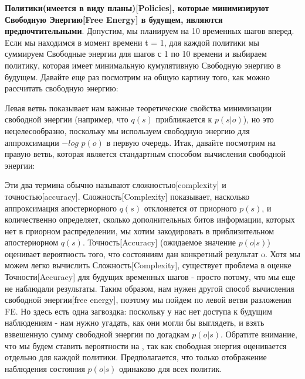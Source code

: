 \documentclass[twoside,leqno, 11pt]{article}
\begin{document}
	\textbf{Политики(имеется в виду планы)[Policies], которые минимизируют Свободную Энергию[Free Energy] в будущем, являются предпочтительными}. Допустим, мы планируем на 10 временных шагов вперед. Если мы находимся в момент времени t = 1, для каждой политики мы суммируем Свободные энергии для шагов с 1 по 10 времени и выбираем политику, которая имеет минимальную кумулятивную Свободную энергию в будущем. Давайте еще раз посмотрим на общую картину того, как можно рассчитать свободную энергию:
	

	Левая ветвь показывает нам важные теоретические свойства минимизации свободной энергии (например, что $q(s)$ приближается к $p(s|o)$), но это нецелесообразно, поскольку мы используем свободную энергию для аппроксимации $-log$ $p(o)$ в первую очередь. Итак, давайте посмотрим на правую ветвь, которая является стандартным способом вычисления свободной энергии:
	

	Эти два термина обычно называют сложностью[complexity] и точностью[accuracy]. Сложность[Complexity] показывает, насколько аппроксимация апостериорного $q(s)$ отклоняется от приорного $p(s)$, и количественно определяет, сколько дополнительных битов информации, которых нет в приорном распределении, мы хотим закодировать в приблизительном апостериорном $q(s)$. Точность[Accuracy] (ожидаемое значение $p(o|s)$) оценивает вероятность того, что состояниям дан конкретный результат o. Хотя мы можем легко вычислить Сложность[Complexity], существует проблема в оценке Точности[Accuracy] для будущих временных шагов - просто потому, что мы еще не наблюдали результаты. Таким образом, нам нужен другой способ вычисления свободной энергии[free energy], поэтому мы пойдем по левой ветви разложения FE. Но здесь есть одна загвоздка: поскольку у нас нет доступа к будущим наблюдениям - нам нужно угадать, как они могли бы выглядеть, и взять взвешенную сумму свободной энергии по догадкам $p(o|s)$. Обратите внимание, что мы будем ставить вероятности на \pi, так как свободная энергия оценивается отдельно для каждой политики. Предполагается, что только отображение наблюдения состояния $p(o|s)$ одинаково для всех политик.
	

	
\end{document}
